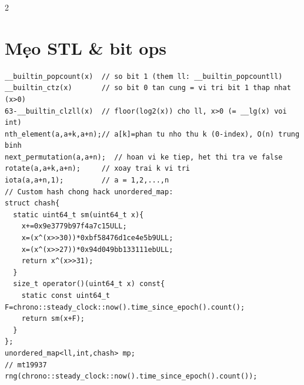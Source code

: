 \documentclass[8pt]{extarticle}
\begin{document}
\begin{multicols}{2}
\section{Mẹo STL \& bit ops}
\begin{lstlisting}
__builtin_popcount(x)  // so bit 1 (them ll: __builtin_popcountll)
__builtin_ctz(x)       // so bit 0 tan cung = vi tri bit 1 thap nhat (x>0)
63-__builtin_clzll(x)  // floor(log2(x)) cho ll, x>0 (= __lg(x) voi int)
nth_element(a,a+k,a+n);// a[k]=phan tu nho thu k (0-index), O(n) trung binh
next_permutation(a,a+n);  // hoan vi ke tiep, het thi tra ve false
rotate(a,a+k,a+n);     // xoay trai k vi tri
iota(a,a+n,1);         // a = 1,2,...,n
// Custom hash chong hack unordered_map:
struct chash{
  static uint64_t sm(uint64_t x){
    x+=0x9e3779b97f4a7c15ULL;
    x=(x^(x>>30))*0xbf58476d1ce4e5b9ULL;
    x=(x^(x>>27))*0x94d049bb133111ebULL;
    return x^(x>>31);
  }
  size_t operator()(uint64_t x) const{
    static const uint64_t F=chrono::steady_clock::now().time_since_epoch().count();
    return sm(x+F);
  }
};
unordered_map<ll,int,chash> mp;
// mt19937 rng(chrono::steady_clock::now().time_since_epoch().count());
\end{lstlisting}

\end{multicols}
\end{document}
